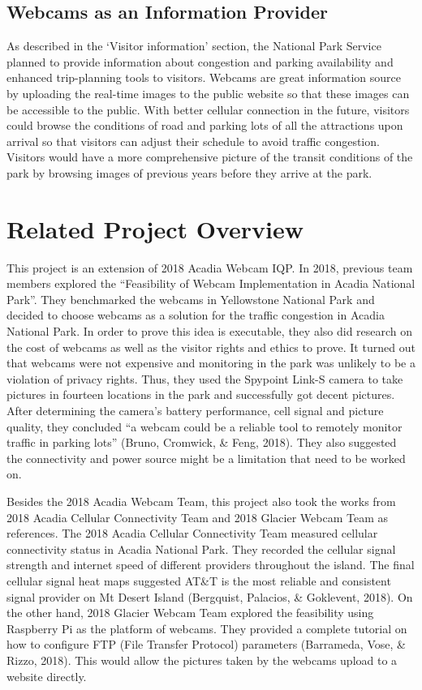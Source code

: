 \subsection{Webcams as an Information Provider}
\par As described in the ‘Visitor information’ section, the National Park Service planned to provide information about congestion and parking availability and enhanced trip-planning tools to visitors. Webcams are great information source by uploading the real-time images to the public website so that these images can be accessible to the public. With better cellular connection in the future, visitors could browse the conditions of road and parking lots of all the attractions upon arrival so that visitors can adjust their schedule to avoid traffic congestion. Visitors would have a more comprehensive picture of the transit conditions of the park by browsing images of previous years before they arrive at the park.

\section{Related Project Overview}
\par This project is an extension of 2018 Acadia Webcam IQP. In 2018, previous team members explored the “Feasibility of Webcam Implementation in Acadia National Park”. They benchmarked the webcams in Yellowstone National Park and decided to choose webcams as a solution for the traffic congestion in Acadia National Park. In order to prove this idea is executable, they also did research on the cost of webcams as well as the visitor rights and ethics to prove. It turned out that webcams were not expensive and monitoring in the park was unlikely to be a violation of privacy rights. Thus, they used the Spypoint Link-S camera to take pictures in fourteen locations in the park and successfully got decent pictures. After determining the camera’s battery performance, cell signal and picture quality, they concluded “a webcam could be a reliable tool to remotely monitor traffic in parking lots” (Bruno, Cromwick, \& Feng, 2018). They also suggested the connectivity and power source might be a limitation that need to be worked on.

\par Besides the 2018 Acadia Webcam Team, this project also took the works from 2018 Acadia Cellular Connectivity Team and 2018 Glacier Webcam Team as references. The 2018 Acadia Cellular Connectivity Team measured cellular connectivity status in Acadia National Park. They recorded the cellular signal strength and internet speed of different providers throughout the island. The final cellular signal heat maps suggested AT\&T is the most reliable and consistent signal provider on Mt Desert Island (Bergquist, Palacios, \& Goklevent, 2018). On the other hand, 2018 Glacier Webcam Team explored the feasibility using Raspberry Pi as the platform of webcams. They provided a complete tutorial on how to configure FTP (File Transfer Protocol) parameters (Barrameda, Vose, \& Rizzo, 2018). This would allow the pictures taken by the webcams upload to a website directly.

